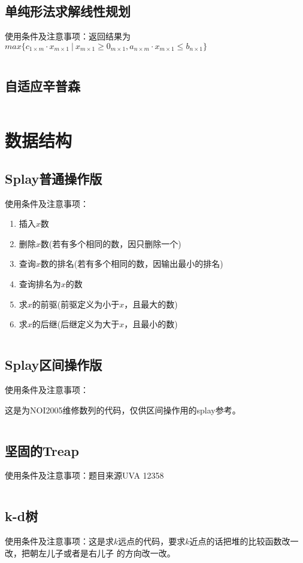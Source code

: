 \documentclass[a4paper,openany]{book}
\newcommand{\cppcode}[1]{
    \inputminted[mathescape,
    			 tabsize=4,
    			 linenos,
    			 frame=single,
    			 framesep=2mm,
    			 breakaftergroup=true,
    			 breakautoindent=true,
    			 breakbytoken=true,
    			 breaklines=true
    ]{cpp}{#1}
}
\begin{document}
\begin{spacing}{1.0}
		\section{单纯形法求解线性规划}
			使用条件及注意事项：返回结果为$max\{c_{1 \times m} \cdot x_{m \times 1} \ | \ x_{m \times 1} \geq 0_{m \times 1}, a_{n \times m} \cdot x_{m \times 1} \leq b_{n \times 1}\}$
			\cppcode{Source/Numerical-Algorithm/Linear-Programming-Simplex.cpp}
		\section{自适应辛普森}
			\cppcode{Source/Numerical-Algorithm/Adaptive-Simpson.cpp}
	\chapter{数据结构}
		\section{Splay普通操作版}
			使用条件及注意事项：\par
			\begin{enumerate}
				\item 插入$x$数
				\item 删除$x$数(若有多个相同的数，因只删除一个)
				\item 查询$x$数的排名(若有多个相同的数，因输出最小的排名)
				\item 查询排名为$x$的数
				\item 求$x$的前驱(前驱定义为小于$x$，且最大的数)
				\item 求$x$的后继(后继定义为大于$x$，且最小的数)
			\end{enumerate}
			\cppcode{Source/Data-Structure/Splay-Normal.cpp}
		\section{Splay区间操作版}
			使用条件及注意事项：\par
			这是为NOI2005维修数列的代码，仅供区间操作用的splay参考。
			\cppcode{Source/Data-Structure/Splay-Interval.cpp}
		\section{坚固的Treap}
			使用条件及注意事项：题目来源UVA 12358
			\cppcode{Source/Data-Structure/Persistent-Treap}
		\section{k-d树}
			使用条件及注意事项：这是求$k$远点的代码，要求$k$近点的话把堆的比较函数改一改，把朝左儿子或者是右儿子
			的方向改一改。
			\cppcode{Source/Data-Structure/K-Dimensional-Tree.cpp}

\end{spacing}
\end{document}
